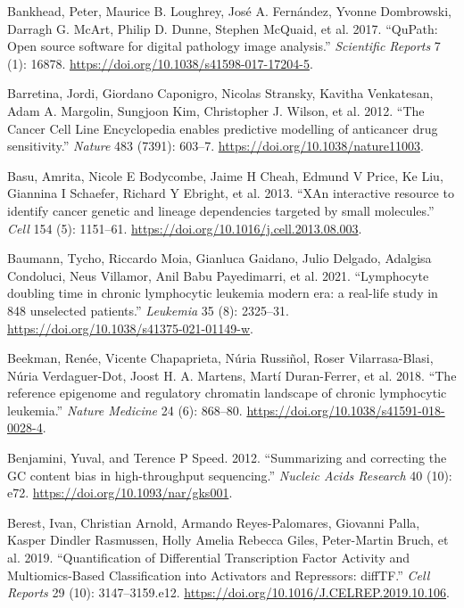 \documentclass[11pt, a4paper, twosided]{book}
\newenvironment{CSLReferences}%
  {}%
  {\par}
\begin{document}
\begin{CSLReferences}{1}{0}
\leavevmode{}%
Bankhead, Peter, Maurice B. Loughrey, José A. Fernández, Yvonne Dombrowski, Darragh G. McArt, Philip D. Dunne, Stephen McQuaid, et al. 2017. {``{QuPath: Open source software for digital pathology image analysis}.''} \emph{Scientific Reports} 7 (1): 16878. \url{https://doi.org/10.1038/s41598-017-17204-5}.

\leavevmode{}%
Barretina, Jordi, Giordano Caponigro, Nicolas Stransky, Kavitha Venkatesan, Adam A. Margolin, Sungjoon Kim, Christopher J. Wilson, et al. 2012. {``{The Cancer Cell Line Encyclopedia enables predictive modelling of anticancer drug sensitivity}.''} \emph{Nature} 483 (7391): 603--7. \url{https://doi.org/10.1038/nature11003}.

\leavevmode{}%
Basu, Amrita, Nicole E Bodycombe, Jaime H Cheah, Edmund V Price, Ke Liu, Giannina I Schaefer, Richard Y Ebright, et al. 2013. {``{XAn interactive resource to identify cancer genetic and lineage dependencies targeted by small molecules}.''} \emph{Cell} 154 (5): 1151--61. \url{https://doi.org/10.1016/j.cell.2013.08.003}.

\leavevmode{}%
Baumann, Tycho, Riccardo Moia, Gianluca Gaidano, Julio Delgado, Adalgisa Condoluci, Neus Villamor, Anil Babu Payedimarri, et al. 2021. {``{Lymphocyte doubling time in chronic lymphocytic leukemia modern era: a real-life study in 848 unselected patients}.''} \emph{Leukemia} 35 (8): 2325--31. \url{https://doi.org/10.1038/s41375-021-01149-w}.

\leavevmode{}%
Beekman, Renée, Vicente Chapaprieta, Núria Russiñol, Roser Vilarrasa-Blasi, Núria Verdaguer-Dot, Joost H. A. Martens, Martí Duran-Ferrer, et al. 2018. {``{The reference epigenome and regulatory chromatin landscape of chronic lymphocytic leukemia}.''} \emph{Nature Medicine} 24 (6): 868--80. \url{https://doi.org/10.1038/s41591-018-0028-4}.

\leavevmode{}%
Benjamini, Yuval, and Terence P Speed. 2012. {``{Summarizing and correcting the GC content bias in high-throughput sequencing.}''} \emph{Nucleic Acids Research} 40 (10): e72. \url{https://doi.org/10.1093/nar/gks001}.

\leavevmode{}%
Berest, Ivan, Christian Arnold, Armando Reyes-Palomares, Giovanni Palla, Kasper Dindler Rasmussen, Holly Amelia Rebecca Giles, Peter-Martin Bruch, et al. 2019. {``{Quantification of Differential Transcription Factor Activity and Multiomics-Based Classification into Activators and Repressors: diffTF}.''} \emph{Cell Reports} 29 (10): 3147--3159.e12. \url{https://doi.org/10.1016/J.CELREP.2019.10.106}.


\end{CSLReferences}
\end{document}
